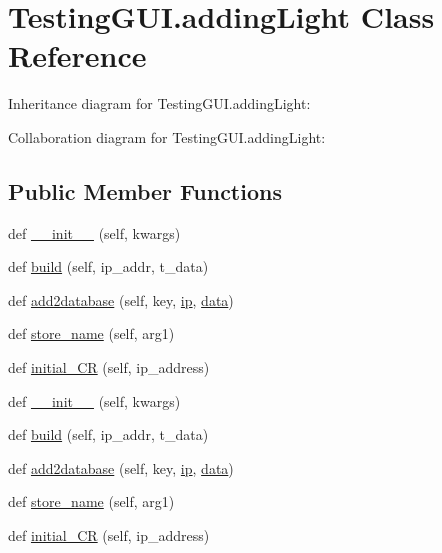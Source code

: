 \hypertarget{classTestingGUI_1_1addingLight}{}\section{Testing\+G\+U\+I.\+adding\+Light Class Reference}
\label{classTestingGUI_1_1addingLight}


Inheritance diagram for Testing\+G\+U\+I.\+adding\+Light\+:


Collaboration diagram for Testing\+G\+U\+I.\+adding\+Light\+:
\subsection*{Public Member Functions}
\begin{DoxyCompactItemize}
\item 
def \hyperlink{classTestingGUI_1_1addingLight_ace8a7edfba84662f465ad3b6cc979ba0}{\+\_\+\+\_\+init\+\_\+\+\_\+} (self, kwargs)
\item 
def \hyperlink{classTestingGUI_1_1addingLight_a09539dcb1cdfd504a9e75937bf380284}{build} (self, ip\+\_\+addr, t\+\_\+data)
\item 
def \hyperlink{classTestingGUI_1_1addingLight_a4ce96f3dc2a6a06664d0c3b724dc5e8a}{add2database} (self, key, \hyperlink{classTestingGUI_1_1addingLight_afc65af761152e3325cc2cc225c9e8f7d}{ip}, \hyperlink{classTestingGUI_1_1addingLight_a763aa941465f77b12ffea9edba79c399}{data})
\item 
def \hyperlink{classTestingGUI_1_1addingLight_adec18b9e79375b11c280acdd672ea15a}{store\+\_\+name} (self, arg1)
\item 
def \hyperlink{classTestingGUI_1_1addingLight_a5804dc70f75e50f75694b529206dabf7}{initial\+\_\+\+CR} (self, ip\+\_\+address)
\item 
def \hyperlink{classTestingGUI_1_1addingLight_ace8a7edfba84662f465ad3b6cc979ba0}{\+\_\+\+\_\+init\+\_\+\+\_\+} (self, kwargs)
\item 
def \hyperlink{classTestingGUI_1_1addingLight_a09539dcb1cdfd504a9e75937bf380284}{build} (self, ip\+\_\+addr, t\+\_\+data)
\item 
def \hyperlink{classTestingGUI_1_1addingLight_a4ce96f3dc2a6a06664d0c3b724dc5e8a}{add2database} (self, key, \hyperlink{classTestingGUI_1_1addingLight_afc65af761152e3325cc2cc225c9e8f7d}{ip}, \hyperlink{classTestingGUI_1_1addingLight_a763aa941465f77b12ffea9edba79c399}{data})
\item 
def \hyperlink{classTestingGUI_1_1addingLight_adec18b9e79375b11c280acdd672ea15a}{store\+\_\+name} (self, arg1)
\item 
def \hyperlink{classTestingGUI_1_1addingLight_a5804dc70f75e50f75694b529206dabf7}{initial\+\_\+\+CR} (self, ip\+\_\+address)
\end{DoxyCompactItemize}

